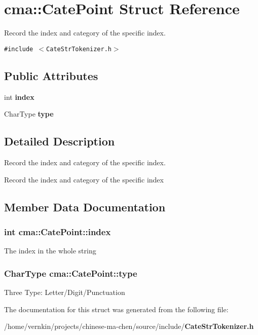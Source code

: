 \section{cma::CatePoint Struct Reference}
\label{structcma_1_1CatePoint}
Record the index and category of the specific index.  


{\tt \#include $<$CateStrTokenizer.h$>$}

\subsection*{Public Attributes}
\begin{CompactItemize}
\item 
int {\bf index}
\item 
CharType {\bf type}
\end{CompactItemize}


\subsection{Detailed Description}
Record the index and category of the specific index. 

Record the index and category of the specific index 

\subsection{Member Data Documentation}
\subsubsection[{index}]{\setlength{\rightskip}{0pt plus 5cm}int {\bf cma::CatePoint::index}}\label{structcma_1_1CatePoint_4d5fb8b0c7028e57ef179c0630f0eee7}


The index in the whole string 
\subsubsection[{type}]{\setlength{\rightskip}{0pt plus 5cm}CharType {\bf cma::CatePoint::type}}\label{structcma_1_1CatePoint_1eddb8c6760d5cd21d5f15b1ee8eb01f}


Three Type: Letter/Digit/Punctuation 

The documentation for this struct was generated from the following file:\begin{CompactItemize}
\item 
/home/vernkin/projects/chinese-ma-chen/source/include/{\bf CateStrTokenizer.h}\end{CompactItemize}

